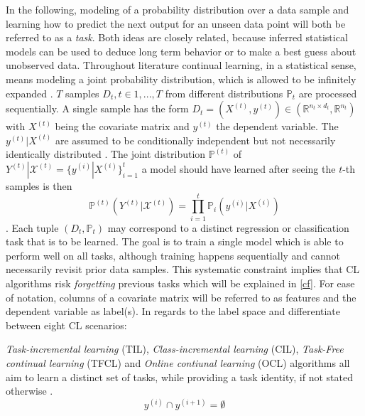 In the following, modeling of a probability distribution over a data sample and learning how to predict the next output for an unseen data point will both be referred to as a \textit{task}. Both ideas are closely related, because inferred statistical models can be used to deduce long term behavior or to make a best guess about unobserved data.
Throughout literature continual learning, in a statistical sense, means modeling a joint probability distribution, which is allowed to be infinitely expanded \cite{LW}. $T$ samples $D_t, t \in {1, ...,T}$ from different distributions $\mathbb{P}_t$ are processed sequentially. A single sample has the form $D_t = (X^{(t)},y^{(t)}) \in (\mathbb{R}^{n_t \times d_t}, \mathbb{R}^{n_t})$ with $X^{(t)}$ being the covariate matrix and $y^{(t)}$ the dependent variable. The $y^{(t)}|X^{(t)}$ are assumed to be conditionally independent but not necessarily identically distributed \cite{LW}. The joint distribution $\mathbb{P}^{(t)}$ of $Y^{(t)}|\mathcal{X}^{(t)} = \{y^{(i)}|X^{(i)}\}_{i=1}^t$ a model should have learned after seeing the $t$-th samples is then
\begin{equation}
	\mathbb{P}^{(t)}(Y^{(t)}|\mathcal{X}^{(t)}) = \prod_{i = 1}^{t}\mathbb{P}_i(y^{(i)}|X^{(i)})
\end{equation}
. Each tuple $(D_t, \mathbb{P}_t)$ may correspond to a distinct regression or classification task that is to be learned. The goal is to train a single model which is able to perform well on all tasks, although training happens sequentially and cannot necessarily revisit prior data samples. This systematic constraint implies that CL algorithms risk \textit{forgetting} previous tasks which will be explained in \autoref{cf}. For ease of notation, columns of a covariate matrix will be referred to as features and the dependent variable as label(s).
In regards to the label space \citeauthor{bidaki2025} \cite{bidaki2025} and \citeauthor{LW} \cite{LW} differentiate between eight CL scenarios:

\textit{Task-incremental learning} (TIL), \textit{Class-incremental learning} (CIL), \textit{Task-Free continual learning} (TFCL) and \textit{Online contiunal learning} (OCL) algorithms all aim to learn a distinct set of tasks, while providing a task identity, if not stated otherwise \cite{bidaki2025, LW}.
\begin{equation}
	y^{(i)} \cap y^{(i+1)} = \emptyset
\end{equation}

